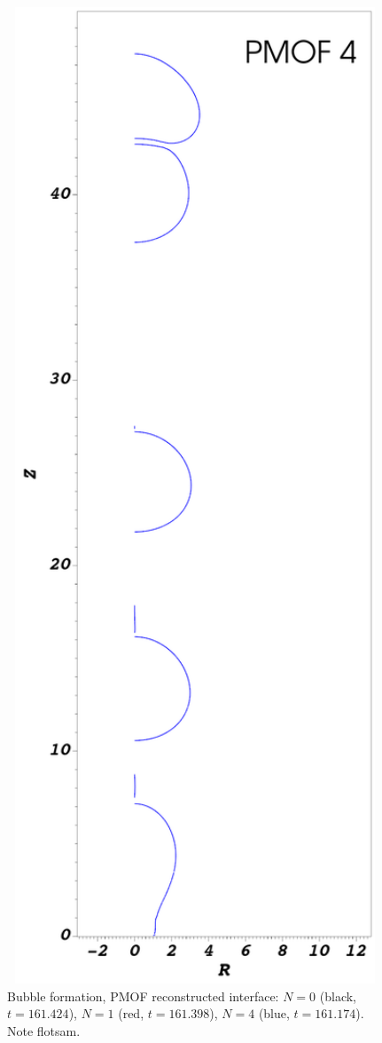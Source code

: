 \documentclass[preprint,12pt]{Definitions/elsarticle}
\begin{document}
\begin{figure}[H]
\begin{minipage}[b]{.32\linewidth}
	\end{minipage}
	\begin{minipage}[b]{.32\linewidth}
		\centering
		\includegraphics[width=1\textwidth]{PMOFbubbleformation/PMOF_4_bubbleformation.png} 
	\end{minipage}
	\caption{Bubble formation, PMOF reconstructed interface: $N = 0$ (black, $t=161.424$), $N = 1$ (red, $t=161.398$), $N = 4$ (blue, $t=161.174$). Note flotsam.}
\end{figure}
\end{document}
